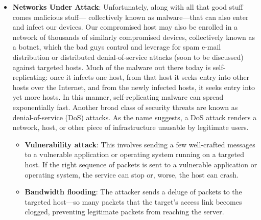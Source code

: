 \documentclass{report}
\begin{document}
\begin{itemize}
            \bigbreak \noindent 
            The added information might include information allowing the receiver-side transport layer to deliver the message up to the appropriate application, and error-detection bits that allow the receiver to determine whether bits in the message have been changed in route. The transport layer then passes the segment to the network layer, which adds network-layer header information such as source and destination end system addresses, creating a \textbf{network-layer datagram}. The datagram is then passed to the link layer, which (of course!) will add its own link-layer header information and create a \textbf{link-layer frame}. Thus, we see that at each layer, a packet has two types of fields: header fields and a \textbf{payload field}. The payload is typically a packet from the layer above.
        \item \textbf{Networks Under Attack}: Unfortunately, along with all that good stuff comes malicious stuff— collectively known as malware—that can also enter and infect our devices. 
            \bigbreak \noindent 
            Our compromised host may also be enrolled in a network of thousands of similarly compromised devices, collectively known as a botnet, which the bad guys control and leverage for spam e-mail distribution or distributed denial-of-service attacks (soon to be discussed) against targeted hosts.
            \bigbreak \noindent 
            Much of the malware out there today is self-replicating: once it infects one host, from that host it seeks entry into other hosts over the Internet, and from the newly infected hosts, it seeks entry into yet more hosts. In this manner, self-replicating malware can spread exponentially fast.
            \bigbreak \noindent 
            Another broad class of security threats are known as denial-of-service (DoS) attacks. As the name suggests, a DoS attack renders a network, host, or other piece of infrastructure unusable by legitimate users.
            \begin{itemize}
                \item \textbf{Vulnerability attack}: This involves sending a few well-crafted messages to a vulnerable application or operating system running on a targeted host. If the right sequence of packets is sent to a vulnerable application or operating system, the service can stop or, worse, the host can crash.
                \item \textbf{Bandwidth flooding}: The attacker sends a deluge of packets to the targeted host—so many packets that the target’s access link becomes clogged, preventing legitimate packets from reaching the server.

\end{itemize}
\end{itemize}
\end{document}
